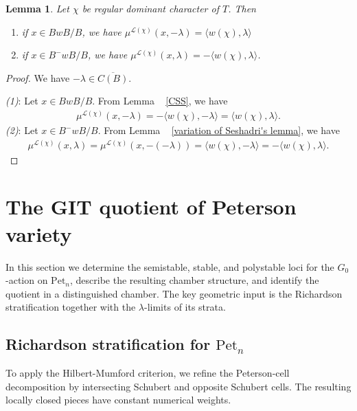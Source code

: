 \documentclass[12pt, reqno]{amsart}
\theoremstyle{plain}
\numberwithin{equation}{section}
\newtheorem{lemma}[theorem]{Lemma}
\theoremstyle{definition}
\begin{document}
\begin{lemma}\label{Section2:Lemma 2.1.4}Let  $\chi$ be regular dominant character of $T$. Then
	\begin{enumerate}
		\item  if $x\in BwB/B$, we have $\mu^{\mathcal{L}(\chi)}(x,-\lambda)=\langle w(\chi),\lambda\rangle$
		\item if $x\in B^{-}wB/B$, we have $\mu^{\mathcal{L}(\chi)}(x,\lambda)=-\langle w(\chi),\lambda\rangle$.
	\end{enumerate}
\end{lemma}
\begin{proof} We have $-\lambda\in\overline{C(B)}$. 
	
	{\it{(1)}}: Let $x\in BwB/B$. %
From Lemma ~ \ref{CSS}, we have
\begin{align*}
	\mu^{\mathcal{L}(\chi)}(x,-\lambda)=-\langle w(\chi),-\lambda\rangle=\langle w(\chi),\lambda\rangle.
\end{align*}
{\it{(2)}}: Let $x\in B^{-}wB/B$. From Lemma ~ \ref{variation of Seshadri's lemma}, we have 
\begin{align*}
	\mu^{\mathcal{L}(\chi)}(x,\lambda)=\mu^{\mathcal{L}(\chi)}(x,-(-\lambda))=\langle w(\chi),-\lambda\rangle=-\langle w(\chi),\lambda\rangle.
\end{align*}
\end{proof}

\section{The GIT quotient of Peterson variety}
In this section we determine the semistable, stable, and polystable
loci for the \(G_0\)-action on \(\mathrm{Pet}_n\), describe the
resulting chamber structure, and identify the quotient in a
distinguished chamber. The key geometric input is the Richardson stratification together with the
\(\lambda\)-limits of its strata.

\subsection{Richardson stratification for $\mathrm{Pet}_n$} To apply the Hilbert-Mumford criterion, we refine the Peterson-cell
decomposition by intersecting Schubert and opposite Schubert cells.
The resulting locally closed pieces have constant numerical weights.
\end{document}
